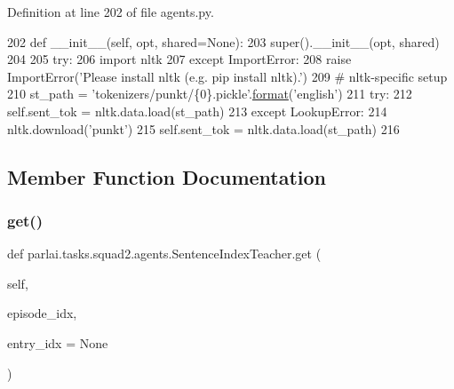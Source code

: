 Definition at line 202 of file agents.\+py.


\begin{DoxyCode}
202     \textcolor{keyword}{def }\_\_init\_\_(self, opt, shared=None):
203         super().\_\_init\_\_(opt, shared)
204 
205         \textcolor{keywordflow}{try}:
206             \textcolor{keyword}{import} nltk
207         \textcolor{keywordflow}{except} ImportError:
208             \textcolor{keywordflow}{raise} ImportError(\textcolor{stringliteral}{'Please install nltk (e.g. pip install nltk).'})
209         \textcolor{comment}{# nltk-specific setup}
210         st\_path = \textcolor{stringliteral}{'tokenizers/punkt/\{0\}.pickle'}.\hyperlink{namespaceparlai_1_1chat__service_1_1services_1_1messenger_1_1shared__utils_a32e2e2022b824fbaf80c747160b52a76}{format}(\textcolor{stringliteral}{'english'})
211         \textcolor{keywordflow}{try}:
212             self.sent\_tok = nltk.data.load(st\_path)
213         \textcolor{keywordflow}{except} LookupError:
214             nltk.download(\textcolor{stringliteral}{'punkt'})
215             self.sent\_tok = nltk.data.load(st\_path)
216 
\end{DoxyCode}


\subsection{Member Function Documentation}
\mbox{\label{classparlai_1_1tasks_1_1squad2_1_1agents_1_1SentenceIndexTeacher_a61367987adc2bf1f623e66d6f690ad57}} 
\subsubsection{\texorpdfstring{get()}{get()}}
{\footnotesize\ttfamily def parlai.\+tasks.\+squad2.\+agents.\+Sentence\+Index\+Teacher.\+get (\begin{DoxyParamCaption}\item[{}]{self,  }\item[{}]{episode\+\_\+idx,  }\item[{}]{entry\+\_\+idx = {\ttfamily None} }\end{DoxyParamCaption})}



